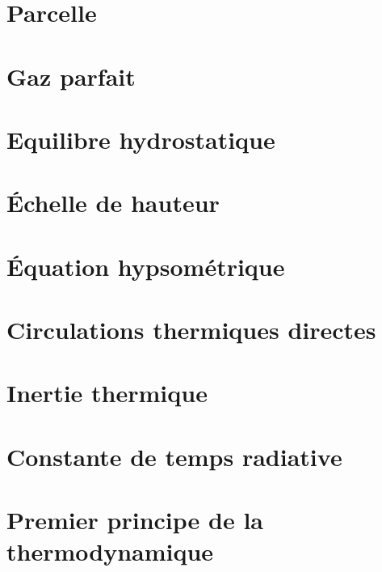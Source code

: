 \documentclass[a4paper,DIV16,10pt]{scrartcl}
\begin{document}
 \inidoc

\newpage
\section{Parcelle}




\newpage
\section{Gaz parfait}


\newpage
\section{Equilibre hydrostatique}


\newpage
\section{\'Echelle de hauteur}

\mk\mk\mk\mk\mk
\begin{detail}

\end{detail}

\newpage
\section{\'Equation hypsométrique}


\newpage
\section{Circulations thermiques directes}


\newpage
\section{Inertie thermique}


\newpage
\section{Constante de temps radiative}


\newpage
\section{Premier principe de la thermodynamique}

\end{document}
